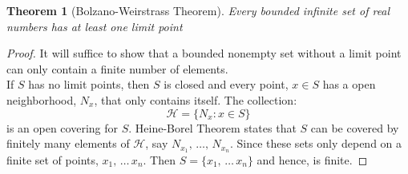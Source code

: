 \documentclass{article}
\newtheorem{definition}{Definition}
\newtheorem{theorem}{Theorem}
\begin{document}
\noindent{}\vspace{10pt}

\begin{theorem}[Bolzano-Weirstrass Theorem]
  Every bounded infinite set of real numbers has at least one limit point
\end{theorem}

\begin{proof}
  It will suffice to show that a bounded nonempty set without a limit point can only contain a finite number of elements. \\

  If $S$ has no limit points, then $S$ is closed and every point, $x \in S$ has a open neighborhood, $N_x$, that only contains itself. The collection:
  $$ \mathcal{H} = \{ N_x : x \in S \} $$
  is an open covering for $S$. Heine-Borel Theorem states that $S$ can be covered by finitely many elements of $\mathcal{H}$, say $N_{x_1},\, \dots ,\, N_{x_n}$. Since these sets only depend on a finite set of points, $x_1, \, \dots \, x_n$. Then $S = \{ x_1, \, \dots \, x_n \}$ and hence, is finite.
\end{proof}
\end{document}
